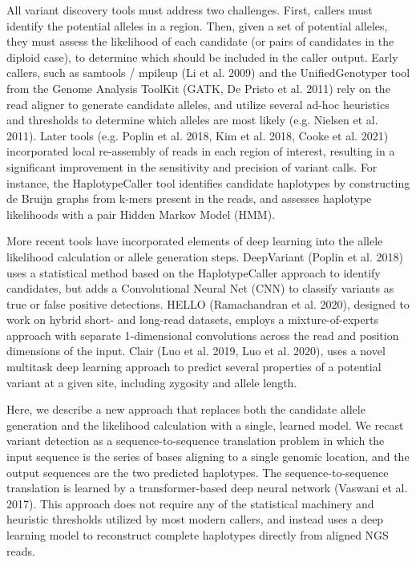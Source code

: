 \documentclass[]{article}
\begin{document}
All variant discovery tools must address two challenges. First, callers must identify the potential alleles in a region. Then, given a set of potential alleles, they must assess the likelihood of each candidate (or pairs of candidates in the diploid case), to determine which should be included in the caller output. Early callers, such as samtools / mpileup (Li et al. 2009) and the UnifiedGenotyper tool from the Genome Analysis ToolKit (GATK, De Pristo et al. 2011) rely on the read aligner to generate candidate alleles, and utilize several ad-hoc heuristics and thresholds to determine which alleles are most likely (e.g. Nielsen et al. 2011). Later tools (e.g. Poplin et al. 2018, Kim et al. 2018, Cooke et al. 2021) incorporated local re-assembly of reads in each region of interest, resulting in a significant improvement in the sensitivity and precision of variant calls. For instance, the HaplotypeCaller tool identifies candidate haplotypes by constructing de Bruijn graphs from k-mers present in the reads, and assesses haplotype likelihoods with a pair Hidden Markov Model (HMM). 

More recent tools have incorporated elements of deep learning into the allele likelihood calculation or allele generation steps. DeepVariant (Poplin et al. 2018) uses a statistical method based on the HaplotypeCaller approach to identify candidates, but adds a Convolutional Neural Net (CNN) to classify variants as true or false positive detections. HELLO (Ramachandran et al. 2020), designed to work on hybrid short- and long-read datasets, employs a mixture-of-experts approach with separate 1-dimensional convolutions across the read and position dimensions of the input. Clair (Luo et al. 2019, Luo et al. 2020), uses a novel multitask deep learning approach to predict several properties of a potential variant at a given site, including zygosity and allele length. 

Here, we describe a new approach that replaces both the candidate allele generation and the likelihood calculation with a single, learned model. We recast variant detection as a sequence-to-sequence translation problem in which the input sequence is the series of bases aligning to a single genomic location, and the output sequences are the two predicted haplotypes. The sequence-to-sequence translation is learned by a transformer-based deep neural network (Vaswani et al. 2017). This approach does not require any of the statistical machinery and heuristic thresholds utilized by most modern callers, and instead uses a deep learning model to reconstruct complete haplotypes directly from aligned NGS reads. 
\end{document}
